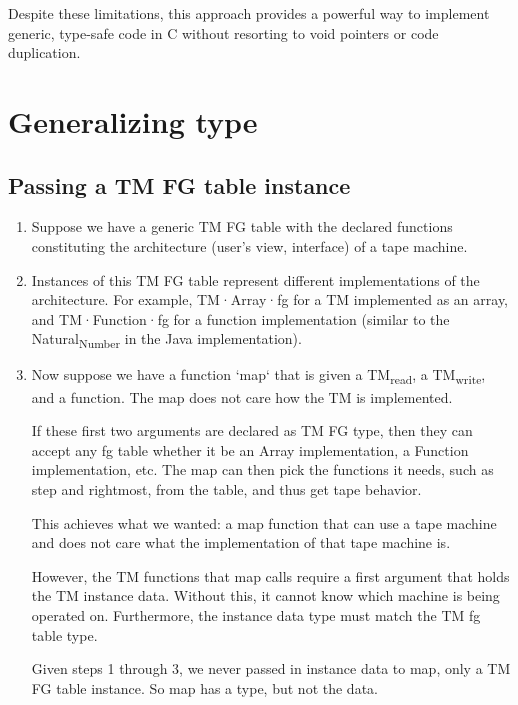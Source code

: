 \documentclass[11pt]{article}
\begin{document}
Despite these limitations, this approach provides a powerful way to implement generic, type-safe code in C without resorting to void pointers or code duplication.

\section{Generalizing type}
\label{sec:orgbc78d46}

\subsection{Passing a TM FG table instance}
\label{sec:org326c1a7}

\begin{enumerate}
\item Suppose we have a generic TM FG table with the declared functions constituting the architecture (user's view, interface) of a tape machine.

\item Instances of this TM FG table represent different implementations of the architecture. For example, TM·Array·fg for a TM implemented as an array, and TM·Function·fg for a function implementation (similar to the Natural\textsubscript{Number} in the Java implementation).

\item Now suppose we have a function `map` that is given a TM\textsubscript{read}, a TM\textsubscript{write}, and a function.
The map does not care how the TM is implemented.

If these first two arguments are declared as TM FG type, then they can accept any fg table whether it be an Array implementation, a Function implementation, etc. The map can then pick the functions it needs, such as step and rightmost, from the
table, and thus get tape behavior. 

This achieves what we wanted: a map function that can use a tape machine and does not care what the implementation of that tape machine is.

However, the TM functions that map calls require a first argument that holds the TM instance data. Without this, it cannot know which machine is being operated on.
Furthermore, the instance data type must match the TM fg table type.

Given steps 1 through 3, we never passed in instance data to map, only a TM FG table instance. So map has a type, but not the data.
\end{enumerate}
\end{document}
